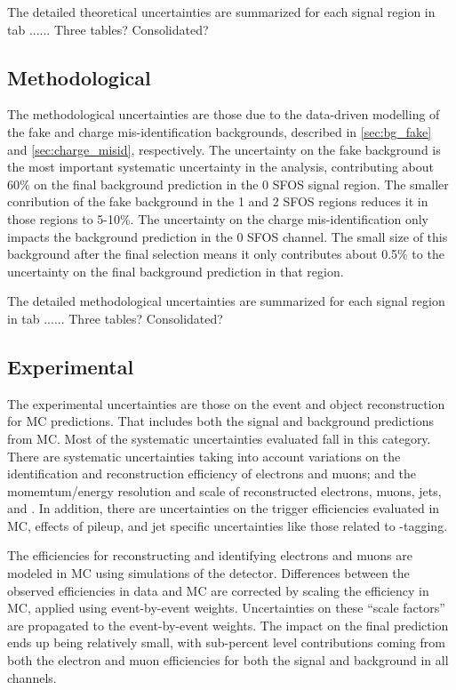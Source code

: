 The detailed theoretical uncertainties are summarized for each signal 
region in tab ...... Three tables? Consolidated?


\subsection{Methodological}
The methodological uncertainties are those due to the data-driven
modelling of the fake and charge mis-identification backgrounds,
described in \sec\ref{sec:bg_fake} and \sec\ref{sec:charge_misid},
respectively.
The uncertainty on the fake background is the most important
systematic uncertainty in the analysis, contributing about 60\%
on the final background prediction in the 0 SFOS signal region.
The smaller conribution of the fake background in the 1 and 2 SFOS
regions reduces it in those regions to 5-10\%.
The uncertainty on the charge mis-identification only impacts the 
background prediction in the 0 SFOS channel.  The small size
of this background after the final selection means it only contributes
about 0.5\% to the uncertainty on the final background prediction in that
region.

The detailed methodological uncertainties are summarized for each signal 
region in tab ...... Three tables? Consolidated?

\subsection{Experimental}
The experimental uncertainties are those on the event and object
reconstruction for MC predictions.  That includes both the signal
and background predictions from MC.
Most of the systematic uncertainties evaluated fall in this category.
There are systematic uncertainties taking into account variations
on the identification and reconstruction
efficiency of electrons and muons; and 
the momemtum/energy resolution and scale of reconstructed electrons, muons,
jets, and \MET. In addition, there are uncertainties on the trigger
efficiencies evaluated in MC, effects of pileup, and jet specific uncertainties
like those related to \bee-tagging.

The efficiencies for reconstructing and identifying electrons and muons
are modeled in MC using simulations of the detector. Differences
between the observed efficiencies in data and MC are corrected by scaling
the efficiency in MC, applied using event-by-event weights. 
Uncertainties on these ``scale factors'' are propagated to the event-by-event
weights.  The impact on the final prediction ends up being relatively
small, with sub-percent level contributions coming from both the electron
and muon efficiencies for both the signal and background in all channels.

